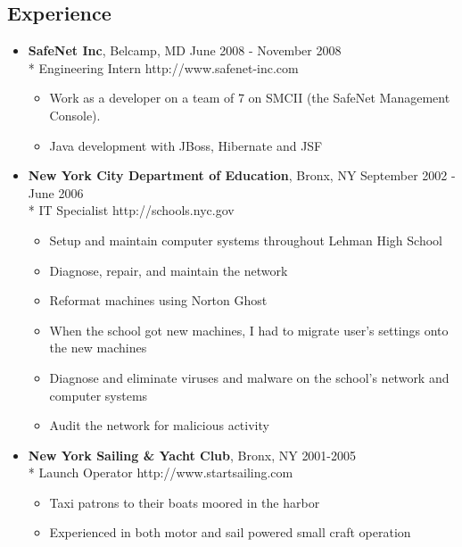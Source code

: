 \documentclass[margin]{res}
\begin{document}
\begin{resume}
\section{\textsf{Experience}}
	\begin{itemize} \itemsep -2pt
		\item {\bf SafeNet Inc}, Belcamp, MD \hfill {\small June 2008 - November
		2008}
		\\* Engineering Intern \hfill {\footnotesize http://www.safenet-inc.com}
		\begin{itemize} \itemsep -2pt
			\item {\small Work as a developer on a team of 7 on SMCII (the SafeNet
			Management Console).}
			\item {\small Java development with JBoss, Hibernate and JSF}
		\end{itemize}
		\item {\bf New York City Department of Education}, Bronx, NY \hfill
		{\small September 2002 - June 2006}
		\\* IT Specialist \hfill {\footnotesize http://schools.nyc.gov}
		\begin{itemize} \itemsep -2pt
			\item {\small Setup and maintain computer systems throughout Lehman
			High School}
			\item {\small Diagnose, repair, and maintain the network}
			\item {\small Reformat machines using Norton Ghost}
			\item {\small When the school got new machines, I had to migrate
			user's settings onto the new machines}
			\item {\small Diagnose and eliminate viruses and malware on the
			school's network and computer systems}
			\item {\small Audit the network for malicious activity}
		\end{itemize}

		\item {\bf New York Sailing \& Yacht Club}, Bronx, NY \hfill {\small
		2001-2005}
		\\* Launch Operator \hfill {\footnotesize http://www.startsailing.com}
		\begin{itemize} \itemsep -2pt
			\item {\small Taxi patrons to their boats moored in the harbor}
			\item {\small Experienced in both motor and sail powered small craft
			operation}
		\end{itemize}


\end{itemize}
\end{resume}
\end{document}

